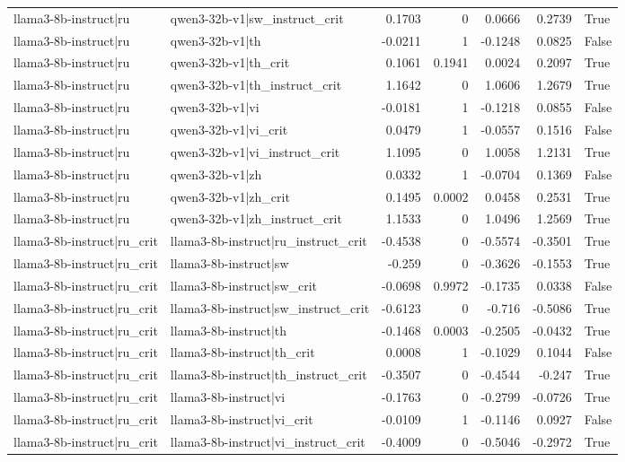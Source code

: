 \begin{table}
\begin{tabular}{l l r r r r l}
llama3-8b-instruct|ru & qwen3-32b-v1|sw_instruct_crit & 0.1703 & 0 & 0.0666 & 0.2739 & True \\
llama3-8b-instruct|ru & qwen3-32b-v1|th & -0.0211 & 1 & -0.1248 & 0.0825 & False \\
llama3-8b-instruct|ru & qwen3-32b-v1|th_crit & 0.1061 & 0.1941 & 0.0024 & 0.2097 & True \\
llama3-8b-instruct|ru & qwen3-32b-v1|th_instruct_crit & 1.1642 & 0 & 1.0606 & 1.2679 & True \\
llama3-8b-instruct|ru & qwen3-32b-v1|vi & -0.0181 & 1 & -0.1218 & 0.0855 & False \\
llama3-8b-instruct|ru & qwen3-32b-v1|vi_crit & 0.0479 & 1 & -0.0557 & 0.1516 & False \\
llama3-8b-instruct|ru & qwen3-32b-v1|vi_instruct_crit & 1.1095 & 0 & 1.0058 & 1.2131 & True \\
llama3-8b-instruct|ru & qwen3-32b-v1|zh & 0.0332 & 1 & -0.0704 & 0.1369 & False \\
llama3-8b-instruct|ru & qwen3-32b-v1|zh_crit & 0.1495 & 0.0002 & 0.0458 & 0.2531 & True \\
llama3-8b-instruct|ru & qwen3-32b-v1|zh_instruct_crit & 1.1533 & 0 & 1.0496 & 1.2569 & True \\
llama3-8b-instruct|ru_crit & llama3-8b-instruct|ru_instruct_crit & -0.4538 & 0 & -0.5574 & -0.3501 & True \\
llama3-8b-instruct|ru_crit & llama3-8b-instruct|sw & -0.259 & 0 & -0.3626 & -0.1553 & True \\
llama3-8b-instruct|ru_crit & llama3-8b-instruct|sw_crit & -0.0698 & 0.9972 & -0.1735 & 0.0338 & False \\
llama3-8b-instruct|ru_crit & llama3-8b-instruct|sw_instruct_crit & -0.6123 & 0 & -0.716 & -0.5086 & True \\
llama3-8b-instruct|ru_crit & llama3-8b-instruct|th & -0.1468 & 0.0003 & -0.2505 & -0.0432 & True \\
llama3-8b-instruct|ru_crit & llama3-8b-instruct|th_crit & 0.0008 & 1 & -0.1029 & 0.1044 & False \\
llama3-8b-instruct|ru_crit & llama3-8b-instruct|th_instruct_crit & -0.3507 & 0 & -0.4544 & -0.247 & True \\
llama3-8b-instruct|ru_crit & llama3-8b-instruct|vi & -0.1763 & 0 & -0.2799 & -0.0726 & True \\
llama3-8b-instruct|ru_crit & llama3-8b-instruct|vi_crit & -0.0109 & 1 & -0.1146 & 0.0927 & False \\
llama3-8b-instruct|ru_crit & llama3-8b-instruct|vi_instruct_crit & -0.4009 & 0 & -0.5046 & -0.2972 & True \\

\end{tabular}
\end{table}
